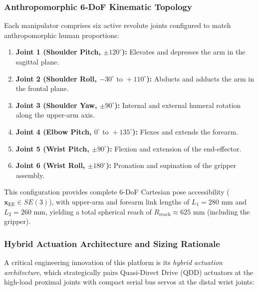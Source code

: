 \subsubsection{Anthropomorphic 6-DoF Kinematic Topology}
Each manipulator comprises six active revolute joints configured to match anthropomorphic human proportions:
\begin{enumerate}[leftmargin=1.5em]
  \item \textbf{Joint 1 (Shoulder Pitch, $\pm 120^\circ$):} Elevates and depresses the arm in the sagittal plane.
  \item \textbf{Joint 2 (Shoulder Roll, $-30^\circ\text{ to }+110^\circ$):} Abducts and adducts the arm in the frontal plane.
  \item \textbf{Joint 3 (Shoulder Yaw, $\pm 90^\circ$):} Internal and external humeral rotation along the upper-arm axis.
  \item \textbf{Joint 4 (Elbow Pitch, $0^\circ\text{ to }+135^\circ$):} Flexes and extends the forearm.
  \item \textbf{Joint 5 (Wrist Pitch, $\pm 90^\circ$):} Flexion and extension of the end-effector.
  \item \textbf{Joint 6 (Wrist Roll, $\pm 180^\circ$):} Pronation and supination of the gripper assembly.
\end{enumerate}
This configuration provides complete 6-DoF Cartesian pose accessibility ($\mathbf{x}_{\text{EE}} \in SE(3)$), with upper-arm and forearm link lengths of $L_1 = 280\text{ mm}$ and $L_2 = 260\text{ mm}$, yielding a total spherical reach of $R_{\text{reach}} \approx 625\text{ mm}$ (including the gripper).

\subsubsection{Hybrid Actuation Architecture and Sizing Rationale}
A critical engineering innovation of this platform is its \emph{hybrid actuation architecture}, which strategically pairs Quasi-Direct Drive (QDD) actuators at the high-load proximal joints with compact serial bus servos at the distal wrist joints:

